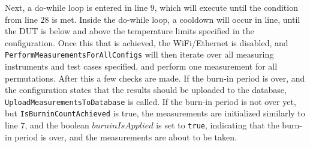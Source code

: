 Next, a do-while loop is entered in line $9$, which will execute until the condition  from line $28$ is met. Inside the do-while loop, a cooldown will occur in line, until the DUT is below and above the temperature limits specified in the configuration. Once this that is achieved, the WiFi/Ethernet is disabled, and \texttt{PerformMeasurementsForAllConfigs} will then iterate over all measuring instruments and test cases specified, and perform one measurement for all permutations. After this a few checks are made. If the burn-in period is over, and the configuration states that the results should be uploaded to the database, \texttt{UploadMeasurementsToDatabase} is called. If the burn-in period is not over yet, but \texttt{IsBurninCountAchieved} is true, the measurements are initialized similarly to line $7$, and the boolean $burninIsApplied$ is set to \texttt{true}, indicating that the burn-in period is over, and the measurements are about to be taken. 
